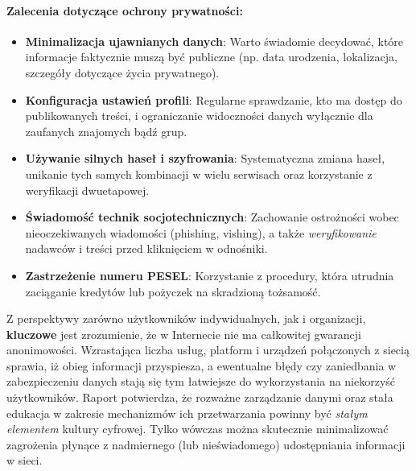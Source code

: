 \paragraph{Zalecenia dotyczące ochrony prywatności:}
\begin{itemize}
    \item \textbf{Minimalizacja ujawnianych danych}: Warto świadomie decydować, które informacje faktycznie muszą być publiczne (np. data urodzenia, lokalizacja, szczegóły dotyczące życia prywatnego).
    \item \textbf{Konfiguracja ustawień profili}: Regularne sprawdzanie, kto ma dostęp do publikowanych treści, i ograniczanie widoczności danych wyłącznie dla zaufanych znajomych bądź grup.
    \item \textbf{Używanie silnych haseł i szyfrowania}: Systematyczna zmiana haseł, unikanie tych samych kombinacji w wielu serwisach oraz korzystanie z weryfikacji dwuetapowej.
    \item \textbf{Świadomość technik socjotechnicznych}: Zachowanie ostrożności wobec nieoczekiwanych wiadomości (phishing, vishing), a także \emph{weryfikowanie} nadawców i treści przed kliknięciem w odnośniki.
    \item \textbf{Zastrzeżenie numeru PESEL}: Korzystanie z procedury, która utrudnia zaciąganie kredytów lub pożyczek na skradzioną tożsamość.
\end{itemize}

\noindent
Z perspektywy zarówno użytkowników indywidualnych, jak i organizacji, \textbf{kluczowe} jest zrozumienie, że w Internecie nie ma całkowitej gwarancji anonimowości. Wzrastająca liczba usług, platform i urządzeń połączonych z siecią sprawia, iż obieg informacji przyspiesza, a ewentualne błędy czy zaniedbania w zabezpieczeniu danych stają się tym łatwiejsze do wykorzystania na niekorzyść użytkowników. Raport potwierdza, że rozważne zarządzanie danymi oraz stała edukacja w zakresie mechanizmów ich przetwarzania powinny być \emph{stałym elementem} kultury cyfrowej. Tylko wówczas można skutecznie minimalizować zagrożenia płynące z nadmiernego (lub nieświadomego) udostępniania informacji w sieci.
